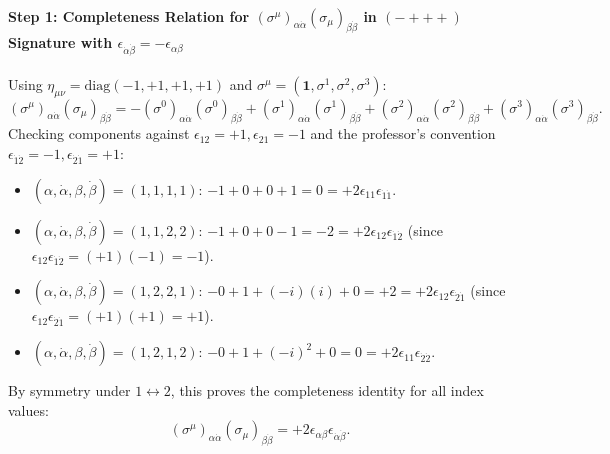 \documentclass[11pt,a4paper]{article}
\begin{document}
\paragraph{Step 1: Completeness Relation for $(\sigma^\mu)_{\alpha\dot{\alpha}} (\sigma_\mu)_{\beta\dot{\beta}}$ in $(-+++)$ Signature with $\epsilon_{\dot{\alpha}\dot{\beta}} = -\epsilon_{\alpha\beta}$}
Using $\eta_{\mu\nu} = \mathrm{diag}(-1, +1, +1, +1)$ and $\sigma^\mu = (\mathbf{1}, \sigma^1, \sigma^2, \sigma^3)$:
\begin{equation}
    (\sigma^\mu)_{\alpha\dot{\alpha}}(\sigma_\mu)_{\beta\dot{\beta}} = -(\sigma^0)_{\alpha\dot{\alpha}}(\sigma^0)_{\beta\dot{\beta}} + (\sigma^1)_{\alpha\dot{\alpha}}(\sigma^1)_{\beta\dot{\beta}} + (\sigma^2)_{\alpha\dot{\alpha}}(\sigma^2)_{\beta\dot{\beta}} + (\sigma^3)_{\alpha\dot{\alpha}}(\sigma^3)_{\beta\dot{\beta}}.
\end{equation}
Checking components against $\epsilon_{12} = +1, \epsilon_{21} = -1$ and the professor's convention $\epsilon_{\dot{1}\dot{2}} = -1, \epsilon_{\dot{2}\dot{1}} = +1$:
\begin{itemize}
    \item $(\alpha,\dot{\alpha},\beta,\dot{\beta}) = (1,1,1,1)$: $-1 + 0 + 0 + 1 = 0 = +2\epsilon_{11}\epsilon_{\dot{1}\dot{1}}$.
    \item $(\alpha,\dot{\alpha},\beta,\dot{\beta}) = (1,1,2,2)$: $-1 + 0 + 0 - 1 = -2 = +2\epsilon_{12}\epsilon_{\dot{1}\dot{2}}$ (since $\epsilon_{12}\epsilon_{\dot{1}\dot{2}} = (+1)(-1) = -1$).
    \item $(\alpha,\dot{\alpha},\beta,\dot{\beta}) = (1,2,2,1)$: $-0 + 1 + (-i)(i) + 0 = +2 = +2\epsilon_{12}\epsilon_{\dot{2}\dot{1}}$ (since $\epsilon_{12}\epsilon_{\dot{2}\dot{1}} = (+1)(+1) = +1$).
    \item $(\alpha,\dot{\alpha},\beta,\dot{\beta}) = (1,2,1,2)$: $-0 + 1 + (-i)^2 + 0 = 0 = +2\epsilon_{11}\epsilon_{\dot{2}\dot{2}}$.
\end{itemize}
By symmetry under $1 \leftrightarrow 2$, this proves the completeness identity for all index values:
\begin{equation}
    (\sigma^\mu)_{\alpha\dot{\alpha}}(\sigma_\mu)_{\beta\dot{\beta}} = +2\epsilon_{\alpha\beta}\epsilon_{\dot{\alpha}\dot{\beta}}.
\end{equation}
\end{document}
